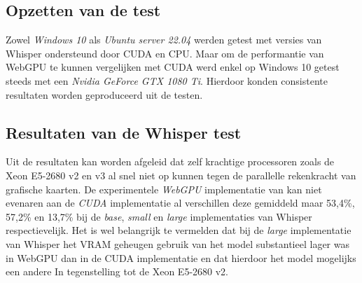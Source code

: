 \subsection*{Opzetten van de test}

Zowel \textit{Windows 10} als \textit{Ubuntu server 22.04} werden getest met versies van Whisper ondersteund door CUDA en CPU. Maar om de performantie van WebGPU te kunnen vergelijken met CUDA werd enkel op Windows 10 getest steeds met een \textit{Nvidia GeForce GTX 1080 Ti}. Hierdoor konden consistente resultaten worden geproduceerd uit de testen.

\break{}







\subsection*{Resultaten van de Whisper test}

Uit de resultaten kan worden afgeleid dat zelf krachtige processoren zoals de Xeon E5-2680 v2 en v3 al snel niet op kunnen tegen de parallelle rekenkracht van grafische kaarten. De experimentele \textit{WebGPU} implementatie van \textcite{Fleetwood2024} kan niet evenaren aan de \textit{CUDA} implementatie al verschillen deze gemiddeld maar 53,4\%, 57,2\% en 13,7\% bij de \textit{base}, \textit{small} en \textit{large} implementaties van Whisper respectievelijk. Het is wel belangrijk te vermelden dat bij de \textit{large} implementatie van Whisper het VRAM geheugen gebruik van het model substantieel lager was in WebGPU dan in de CUDA implementatie en dat hierdoor het model mogelijks een andere In tegenstelling tot de Xeon E5-2680 v2.

